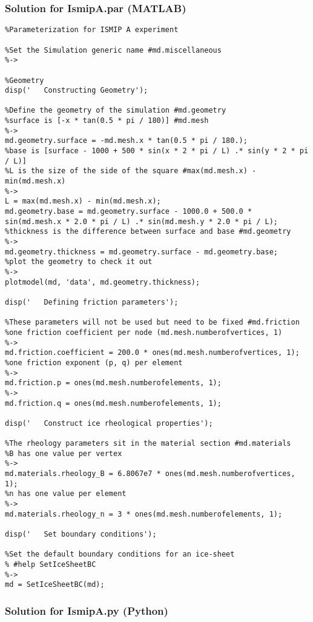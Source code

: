 \subsubsection{Solution for IsmipA.par (MATLAB)}%
\begin{lstlisting}
%Parameterization for ISMIP A experiment

%Set the Simulation generic name #md.miscellaneous
%->

%Geometry
disp('   Constructing Geometry');

%Define the geometry of the simulation #md.geometry
%surface is [-x * tan(0.5 * pi / 180)] #md.mesh
%->
md.geometry.surface = -md.mesh.x * tan(0.5 * pi / 180.);
%base is [surface - 1000 + 500 * sin(x * 2 * pi / L) .* sin(y * 2 * pi / L)]
%L is the size of the side of the square #max(md.mesh.x) - min(md.mesh.x)
%->
L = max(md.mesh.x) - min(md.mesh.x);
md.geometry.base = md.geometry.surface - 1000.0 + 500.0 * sin(md.mesh.x * 2.0 * pi / L) .* sin(md.mesh.y * 2.0 * pi / L);
%thickness is the difference between surface and base #md.geometry
%->
md.geometry.thickness = md.geometry.surface - md.geometry.base;
%plot the geometry to check it out
%->
plotmodel(md, 'data', md.geometry.thickness);

disp('   Defining friction parameters');

%These parameters will not be used but need to be fixed #md.friction
%one friction coefficient per node (md.mesh.numberofvertices, 1)
%->
md.friction.coefficient = 200.0 * ones(md.mesh.numberofvertices, 1);
%one friction exponent (p, q) per element
%->
md.friction.p = ones(md.mesh.numberofelements, 1);
%->
md.friction.q = ones(md.mesh.numberofelements, 1);

disp('   Construct ice rheological properties');

%The rheology parameters sit in the material section #md.materials
%B has one value per vertex
%->
md.materials.rheology_B = 6.8067e7 * ones(md.mesh.numberofvertices, 1);
%n has one value per element
%->
md.materials.rheology_n = 3 * ones(md.mesh.numberofelements, 1);

disp('   Set boundary conditions');

%Set the default boundary conditions for an ice-sheet
% #help SetIceSheetBC
%->
md = SetIceSheetBC(md);
\end{lstlisting}
\subsubsection{Solution for IsmipA.py (Python)}%
\begin{lstlisting}


\end{lstlisting}
